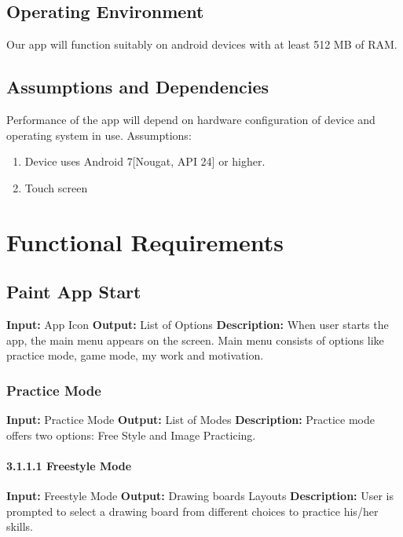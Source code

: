 \documentclass{scrreprt}
\begin{document}
\section{Operating Environment}
Our app will function suitably on android devices with at least 512 MB of RAM.

\section{Assumptions and Dependencies}
Performance of the app will depend on hardware configuration of device and operating system in use.
\newline
Assumptions:
\begin{enumerate}[itemsep=0.5pt]
    \item Device uses Android 7[Nougat, API 24] or higher.
    \item Touch screen
\end{enumerate}

\chapter{Functional Requirements}
\section{Paint App Start}
\textbf{Input:} App Icon \newline
\textbf{Output:} List of Options
\vspace{1mm}\newline
\textbf{Description:} \newline 
When user starts the app, the main menu appears on the screen. Main menu consists of options like practice mode, game mode, my work and motivation.

\subsection{Practice Mode}
\textbf{Input:} Practice Mode \newline
\textbf{Output:} List of Modes
\vspace{1mm}\newline
\textbf{Description:} \newline 
Practice mode offers two options:  Free Style and Image Practicing.

\subsubsection{3.1.1.1 Freestyle Mode}
\textbf{Input:} Freestyle Mode \newline
\textbf{Output:} Drawing boards Layouts
\vspace{1mm}\newline
\textbf{Description:} \newline 
User is prompted to select a drawing board from different choices to practice his/her skills.
\end{document}
